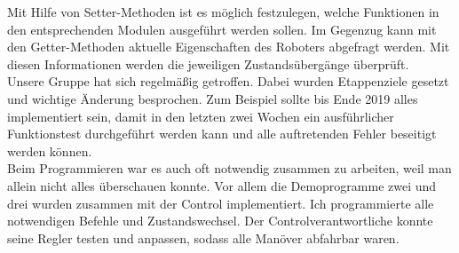 \noindent Mit Hilfe von Setter-Methoden ist es möglich festzulegen, welche Funktionen in den entsprechenden Modulen ausgeführt werden sollen.
Im Gegenzug kann mit den Getter-Methoden aktuelle Eigenschaften des Roboters abgefragt werden. Mit diesen Informationen werden die jeweiligen Zustandsübergänge überprüft.\\

\noindent Unsere Gruppe hat sich regelmäßig getroffen. Dabei wurden Etappenziele gesetzt und wichtige Änderung besprochen. Zum Beispiel sollte bis Ende 2019 alles implementiert sein, damit in den letzten zwei Wochen ein ausführlicher Funktionstest durchgeführt werden kann und alle auftretenden Fehler beseitigt werden können.\\

\noindent Beim Programmieren war es auch oft notwendig zusammen zu arbeiten, weil man allein nicht alles überschauen konnte. Vor allem die Demoprogramme zwei und drei wurden zusammen mit der Control implementiert. Ich programmierte alle notwendigen Befehle und Zustandswechsel. Der Controlverantwortliche konnte seine Regler testen und anpassen, sodass alle Manöver abfahrbar waren.